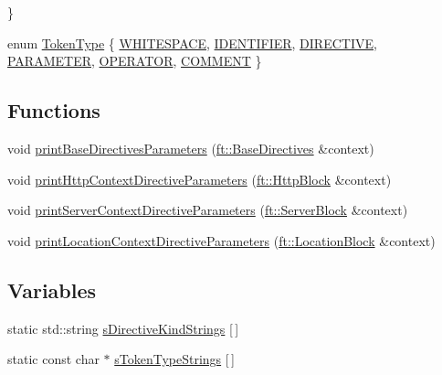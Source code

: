 \begin{DoxyCompactItemize}
 \}
\item 
enum \hyperlink{namespaceft_aa520fbf142ba1e7e659590c07da31921}{Token\+Type} \{ \newline
\hyperlink{namespaceft_aa520fbf142ba1e7e659590c07da31921aba113c37f25d24aada154b75c7dd91ba}{W\+H\+I\+T\+E\+S\+P\+A\+CE}, 
\hyperlink{namespaceft_aa520fbf142ba1e7e659590c07da31921a84f8ae2490f9e4bd2321fd21f4b0e807}{I\+D\+E\+N\+T\+I\+F\+I\+ER}, 
\hyperlink{namespaceft_aa520fbf142ba1e7e659590c07da31921ae3852cb010d5e422026faf83b3c16f0e}{D\+I\+R\+E\+C\+T\+I\+VE}, 
\hyperlink{namespaceft_aa520fbf142ba1e7e659590c07da31921a194cde856bd2d79eac8adb9741c55940}{P\+A\+R\+A\+M\+E\+T\+ER}, 
\newline
\hyperlink{namespaceft_aa520fbf142ba1e7e659590c07da31921a6411d9d6073252e4d316493506bbb979}{O\+P\+E\+R\+A\+T\+OR}, 
\hyperlink{namespaceft_aa520fbf142ba1e7e659590c07da31921aae696377c19e507b64e16be78ce3bbdb}{C\+O\+M\+M\+E\+NT}
 \}
\end{DoxyCompactItemize}
\subsection*{Functions}
\begin{DoxyCompactItemize}
\item 
void \hyperlink{namespaceft_af12105e484dbac115fe1d6a4ff074f27}{print\+Base\+Directives\+Parameters} (\hyperlink{classft_1_1_base_directives}{ft\+::\+Base\+Directives} \&context)
\item 
void \hyperlink{namespaceft_a227dfbe1be478e0415b853df46dec985}{print\+Http\+Context\+Directive\+Parameters} (\hyperlink{classft_1_1_http_block}{ft\+::\+Http\+Block} \&context)
\item 
void \hyperlink{namespaceft_aba285440a3c3f0158982e0376d6a24f6}{print\+Server\+Context\+Directive\+Parameters} (\hyperlink{classft_1_1_server_block}{ft\+::\+Server\+Block} \&context)
\item 
void \hyperlink{namespaceft_a0036b0ebdedb1a1a1956f4ac3fafdbc4}{print\+Location\+Context\+Directive\+Parameters} (\hyperlink{classft_1_1_location_block}{ft\+::\+Location\+Block} \&context)
\end{DoxyCompactItemize}
\subsection*{Variables}
\begin{DoxyCompactItemize}
\item 
static std\+::string \hyperlink{namespaceft_a2896a632198d516af93e4aea2d125f59}{s\+Directive\+Kind\+Strings} \mbox{[}$\,$\mbox{]}
\item 
static const char $\ast$ \hyperlink{namespaceft_a1b9b00bc284da71346729142b8560e03}{s\+Token\+Type\+Strings} \mbox{[}$\,$\mbox{]}
\end{DoxyCompactItemize}


